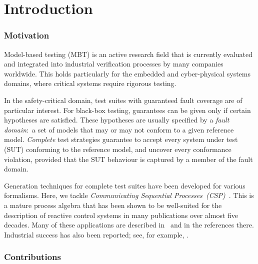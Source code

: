 
\section{Introduction}
\label{sec:intro}


\subsubsection*{Motivation}

Model-based testing (MBT) is an  active research field that is currently
evaluated and integrated into industrial verification processes by many
companies worldwide. This holds particularly for the embedded and
cyber-physical systems domains, where critical systems require rigorous
testing.

In the safety-critical domain, test suites with guaranteed fault coverage are
of particular interest. For black-box testing, guarantees can be given only
if certain hypotheses are satisfied. These hypotheses are usually specified
by a \emph{fault domain}:~a set of models that may or may not conform to a
given reference model. \emph{Complete} test strategies guarantee to accept
every  system under test (SUT) conforming to the reference model, and uncover
every conformance violation, provided that the SUT behaviour is captured by a
member of the fault domain.

Generation techniques for complete test suites have been developed for
various formalisms. Here, we tackle \emph{Communicating Sequential
Processes~(CSP)}~\cite{Hoare:1985:CSP:3921,Roscoe2010}. This is a mature
process algebra that has been shown to be well-suited for the description of
reactive control systems in many publications over almost five decades. Many
of these applications are described in~\cite{Roscoe2010} and in the
references there. Industrial success has also been reported; see, for
example, \cite{976937,DBLP:conf/prdc/ShiPK99,DBLP:conf/amast/ButhKPS97}.


\subsubsection*{Contributions}

